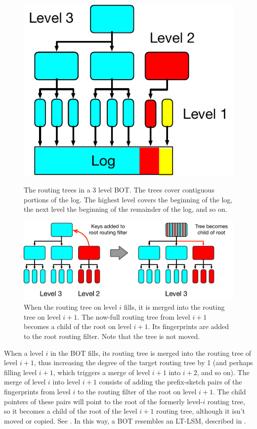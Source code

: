 \begin{figure}[h!]
	\centering
	\begin{minipage}[t]{0.4\textwidth}
		\centering
		\includegraphics[height=0.5\textwidth]{figures/routing_tree.pdf}
		\caption{The routing trees in a 3 level BOT. The trees
                  cover contiguous portions of the log.  The highest
                  level covers the beginning of the log, the next
                  level the beginning of the remainder of the log, and so on.}
		\label{fig:routing_tree}
	\end{minipage}\hfill
	\begin{minipage}[t]{0.55\textwidth}
		\centering
		\includegraphics[height=0.4\textwidth]{figures/routing_tree_merge.pdf}
		\caption{When the routing tree on level $i$ fills, it is merged into
			the routing tree on level $i+1$. The now-full routing tree from
			level $i+1$ becomes a child of the root on level $i+1$. Its
			fingerprints are added to the root routing filter. Note that the
			tree is not moved.}
		\label{fig:routing_tree_merge}
	\end{minipage}
\end{figure}

When a level $i$ in the BOT fills, its routing tree is merged into the routing
tree of level $i+1$, thus increasing the degree of the target routing tree by 1 (and
perhaps filling level $i+1$, which triggers a merge of level $i+1$ into
$i+2$, and so on). The merge of level $i$ into level $i+1$ consists of adding
the prefix-sketch pairs of the fingerprints from level $i$ to the routing
filter of the root on level $i+1$. The child pointers of these pairs will point
to the root of the formerly level-$i$ routing tree, so it becomes a child of
the root of the level $i+1$ routing tree, although it isn't moved or copied.
See . In this way, a BOT resembles an LT-LSM,
described in .

